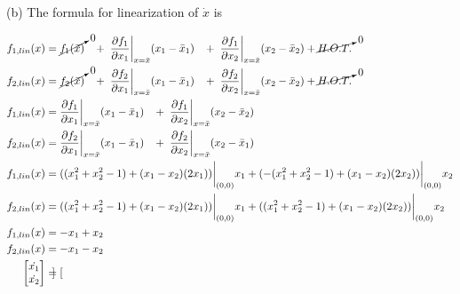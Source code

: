 \documentclass{article}
\begin{document}
  \newpage

  (b) The formula for linearization of $\dot{x}$ is

  \begin{align*}
    f_{1, lin}(x) &= \cancelto{0}{f_1(\bar{x})} \hspace{3.0mm} + \hspace{1.0mm}
    \frac{\partial f_1}{\partial x_1}\bigg|_{x=\bar{x}}(x_1-\bar{x}_1) \hspace{3.0mm} + \hspace{1.0mm}
    \frac{\partial f_1}{\partial x_2}\bigg|_{x=\bar{x}}(x_2-\bar{x}_2)+ \cancelto{0}{H.O.T.} \\ 
    f_{2, lin}(x) &= \cancelto{0}{f_2(\bar{x})} \hspace{3.0mm} + \hspace{1.0mm}
    \frac{\partial f_2}{\partial x_1}\bigg|_{x=\bar{x}}(x_1-\bar{x}_1) \hspace{3.0mm} + \hspace{1.0mm}
    \frac{\partial f_2}{\partial x_2}\bigg|_{x=\bar{x}}(x_2-\bar{x}_2)+ \cancelto{0}{H.O.T.} \\
    f_{1, lin}(x) &= \frac{\partial f_1}{\partial x_1}\bigg|_{x=\bar{x}}(x_1-\bar{x}_1) \hspace{3.0mm} + \hspace{1.0mm}
    \frac{\partial f_1}{\partial x_2}\bigg|_{x=\bar{x}}(x_2-\bar{x}_2) \\ 
    f_{2, lin}(x) &= \frac{\partial f_2}{\partial x_1}\bigg|_{x=\bar{x}}(x_1-\bar{x}_1) \hspace{3.0mm} + \hspace{1.0mm}
    \frac{\partial f_2}{\partial x_2}\bigg|_{x=\bar{x}}(x_2-\bar{x}_1) \\     
    f_{1, lin}(x) &= ((x_1^2 + x_2^2 -1) + (x_1 - x_2)(2x_1))\bigg|_{(0,0)}x_1 + (-(x_1^2 + x_2^2 -1) + (x_1 - x_2)(2x_2))\bigg|_{(0,0)}x_2\\
    f_{2, lin}(x) &= ((x_1^2 + x_2^2 -1) + (x_1 - x_2)(2x_1))\bigg|_{(0,0)}x_1 + ((x_1^2 + x_2^2 -1) + (x_1 - x_2)(2x_2))\bigg|_{(0,0)}x_2\\
    f_{1, lin}(x) &= -x_1 + x_2 \\
    f_{2, lin}(x) &= -x_1 - x_2 \\
    \begin{bmatrix}
      \dot{x_1} \\
      \dot{x_2}
    \end{bmatrix} &=
    \begin{bmatrix}

\end{bmatrix}
\end{align*}
\end{document}
